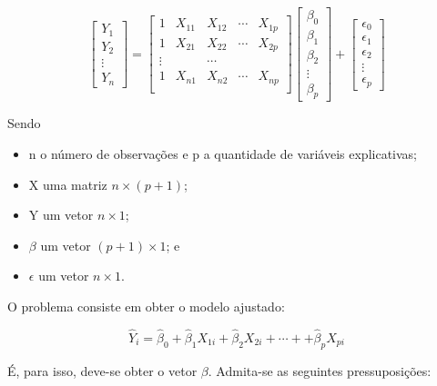 \documentclass[
]{book}
\providecommand{\tightlist}{%
  \setlength{\itemsep}{0pt}\setlength{\parskip}{0pt}}
\begin{document}
\begin{equation*}
\begin{bmatrix}
Y_1\\
Y_2\\
\vdots \\
Y_n
\end{bmatrix}=
\begin{bmatrix}
1 & X_{11} & X_{12} & \cdots & X_{1p} \\
1 & X_{21} & X_{22} & \cdots & X_{2p} \\
\vdots &        & \cdots &            \\
1 & X_{n1} & X_{n2} & \cdots & X_{np} \\
\end{bmatrix}
\begin{bmatrix}
\beta_0\\
\beta_1\\
\beta_2\\
\vdots \\
\beta_p
\end{bmatrix}+
\begin{bmatrix}
\epsilon_0\\
\epsilon_1\\
\epsilon_2\\
\vdots \\
\epsilon_p
\end{bmatrix}
\end{equation*}

Sendo

\begin{itemize}
\tightlist
\item
  n o número de observações e p a quantidade de variáveis explicativas;
\item
  X uma matriz \(n \times (p+1)\);
\item
  Y um vetor \(n \times 1\);
\item
  \(\beta\) um vetor \((p+1) \times 1\); e
\item
  \(\epsilon\) um vetor \(n \times 1\).
\end{itemize}

O problema consiste em obter o modelo ajustado:

\begin{equation*}
\hat{Y}_i = \hat{\beta}_0 + \hat{\beta}_1X_{1i} + \hat{\beta}_2X_{2i} + \cdots +
+ \hat{\beta}_p X_{pi}
\end{equation*}

É, para isso, deve-se obter o vetor \(\beta\). Admita-se as seguintes pressuposições:
\end{document}

